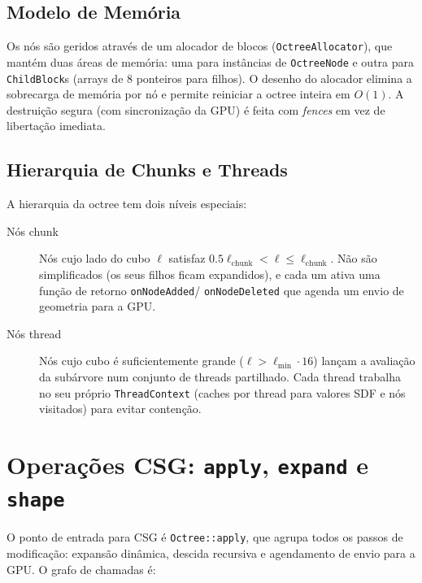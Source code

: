 \documentclass[10pt,a4paper]{article}
\begin{document}
\subsection{Modelo de Memória}

Os nós são geridos através de um alocador de blocos
(\lstinline{OctreeAllocator}), que mantém duas áreas de memória:
uma para instâncias de \lstinline{OctreeNode} e outra para
\lstinline{ChildBlock}s (arrays de 8 ponteiros para filhos). O
desenho do alocador elimina a sobrecarga de memória por nó e permite
reiniciar a octree inteira em $O(1)$. A destruição segura (com
sincronização da GPU) é feita com \emph{fences} em vez de libertação
imediata.

\subsection{Hierarquia de Chunks e Threads}

A hierarquia da octree tem dois níveis especiais:
\begin{description}
  \item[Nós chunk] Nós cujo lado do cubo $\ell$ satisfaz
    $0.5\ell_{\mathrm{chunk}} < \ell \leq \ell_{\mathrm{chunk}}$.
    Não são simplificados (os seus filhos ficam expandidos), e cada
    um ativa uma função de retorno \lstinline{onNodeAdded}/
    \lstinline{onNodeDeleted} que agenda um envio de geometria para
    a GPU.
  \item[Nós thread] Nós cujo cubo é suficientemente grande
    ($\ell > \ell_{\min} \cdot 16$) lançam a avaliação da subárvore
    num conjunto de threads partilhado. Cada thread trabalha no seu
    próprio \lstinline{ThreadContext} (caches por thread para valores
    SDF e nós visitados) para evitar contenção.
\end{description}

\section{Operações CSG: \texttt{apply}, \texttt{expand} e \texttt{shape}}
\label{sec:shape}

O ponto de entrada para CSG é \lstinline{Octree::apply}, que agrupa
todos os passos de modificação: expansão dinâmica, descida recursiva
e agendamento de envio para a GPU. O grafo de chamadas é:
\end{document}
